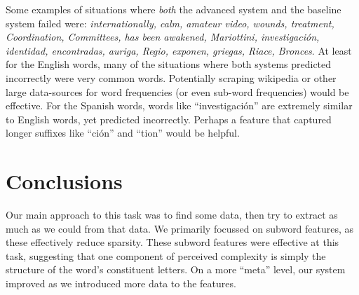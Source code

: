 \documentclass[11pt,a4paper]{article}
\begin{document}
Some examples of situations where \emph{both} the advanced system and the baseline system failed were: \emph{internationally, calm, amateur video, wounds, treatment, Coordination, Committees, has been awakened, Mariottini, investigación, identidad, encontradas, auriga, Regio, exponen, griegas, Riace, Bronces}. At least for the English words, many of the situations where both systems predicted incorrectly were very common words. Potentially scraping wikipedia or other large data-sources for word frequencies (or even sub-word frequencies) would be effective. For the Spanish words, words like \enquote{investigación} are extremely similar to English words, yet predicted incorrectly. Perhaps a feature that captured longer suffixes like \enquote{ción} and \enquote{tion} would be helpful.

\section{Conclusions}

Our main approach to this task was to find some data, then try to extract as much as we could from that data. We primarily focussed on subword features, as these effectively reduce sparsity. These subword features were effective at this task, suggesting that one component of perceived complexity is simply the structure of the word's constituent letters. On a more \enquote{meta} level, our system improved as we introduced more data to the features.

%
%



\end{document}
